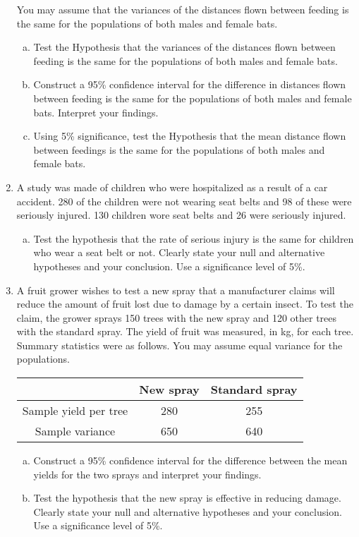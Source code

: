 \documentclass[a4paper,12pt]{article}
\begin{document}
\begin{enumerate}
You may assume that the variances of the distances flown between feeding is the same for the populations of both males and female bats.


\begin{enumerate}[(a)]
\item Test the Hypothesis that the variances of the distances flown between feeding is the same for the populations of both males and female bats.
\item Construct a 95\% confidence interval for the difference in distances flown between feeding is the same for the populations of both males and female bats. Interpret your findings. 
\item Using 5\% significance, test the Hypothesis that the mean distance flown between feedings is the same for the populations of both males and female bats.
\end{enumerate}
 \item  A study was made of children who were hospitalized as a result of a car accident. 280 of the children were not wearing seat belts and 98 of these were seriously injured. 130 children wore seat belts and 26 were seriously injured. 
\begin{enumerate}[(a)]
\item Test the hypothesis that the rate of serious injury is the same for children who wear a seat belt or not. Clearly state your null and alternative hypotheses and your conclusion. Use a significance level of 5\%.
\end{enumerate}
\item A fruit grower wishes to test a new spray that a manufacturer claims will
reduce the amount of fruit lost due to damage by a certain insect. To test
the claim, the grower sprays 150 trees with the new spray and 120 other
trees with the standard spray. The yield of fruit was measured, in kg, for
each tree. Summary statistics were as follows. You may assume equal variance for the populations.

\begin{center}
\begin{tabular}{|c|c|c|} \hline 
                       & New spray & Standard spray\\ \hline 
Sample yield per tree  & 280       & 255\\ \hline 
Sample variance        & 650      & 640\\ \hline 
\end{tabular}
\end{center}
\begin{enumerate}[(a)]
\item  Construct a 95\% confidence interval for the difference between the mean yields for the two sprays and interpret your findings. 
\item  Test the hypothesis that the new spray is effective in reducing damage. Clearly state your null and alternative hypotheses and your conclusion. Use a significance level of 5\%.
\end{enumerate}


\end{enumerate}
\end{document}
